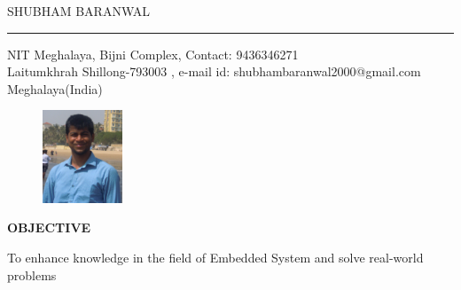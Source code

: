 \documentclass{article}
\begin{document}
 \begin{center}
 	 {
 	 	\large { SHUBHAM BARANWAL}
 	 }
 	
 \end{center}
 \hrule
 \begin{flushleft}
 	NIT Meghalaya, Bijni Complex, 		\hspace{1.7in}    		    Contact: 9436346271            \\
 	Laitumkhrah Shillong-793003  , 		\hspace{1.8in}		   e-mail id: shubhambaranwal2000@gmail.com\\
 	Meghalaya(India)     \\
\end{flushleft}

\vspace{-0.3in}

\begin{figure}[h]
	\hspace{4.4in}
	\includegraphics[width=90px]{shubham}
\end{figure}


\begin{flushleft}
	\vspace{0.2in}
	\textbf{OBJECTIVE}
	
	\vspace{-0.20in}
	\hspace{1.4in}
	To enhance knowledge in the field of Embedded System and solve real-world \\
	\hspace{1.4in} problems
	
\end{flushleft}
\end{document}
